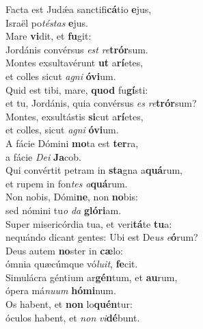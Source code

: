 \evenverse Facta est Judǽa sanctifi\textbf{cá}tio \textbf{e}jus,~\*\\
\evenverse Israël po\textit{té}\textit{stas} \textbf{e}jus.\\
\oddverse Mare \textbf{vi}dit, et \textbf{fu}git:~\*\\
\oddverse Jordánis convérsus \textit{est} \textit{re}\textbf{trór}sum.\\
\evenverse Montes exsultavérunt \textbf{ut} a\textbf{rí}etes,~\*\\
\evenverse et colles sicut \textit{a}\textit{gni} \textbf{ó}\textbf{vi}um.\\
\oddverse Quid est tibi, mare, \textbf{quod} fu\textbf{gí}sti:~\*\\
\oddverse et tu, Jordánis, quia convérsus \textit{es} \textit{re}\textbf{trór}sum?\\
\evenverse Montes, exsultástis \textbf{si}cut a\textbf{rí}etes,~\*\\
\evenverse et colles, sicut \textit{a}\textit{gni} \textbf{ó}\textbf{vi}um.\\
\oddverse A fácie Dómini \textbf{mo}ta est \textbf{ter}ra,~\*\\
\oddverse a fácie \textit{De}\textit{i} \textbf{Ja}cob.\\
\evenverse Qui convértit petram in \textbf{sta}gna a\textbf{quá}rum,~\*\\
\evenverse et rupem in fon\textit{tes} \textit{a}\textbf{quá}rum.\\
\oddverse Non nobis, Dómi\textbf{ne}, non \textbf{no}bis:~\*\\
\oddverse sed nómini tu\textit{o} \textit{da} \textbf{gló}\textbf{ri}am.\\
\evenverse Super misericórdia tua, et veri\textbf{tá}te \textbf{tu}a:~\*\\
\evenverse nequándo dicant gentes: Ubi est De\textit{us} \textit{e}\textbf{ó}rum?\\
\oddverse Deus autem \textbf{no}ster in \textbf{cæ}lo:~\*\\
\oddverse ómnia quæcúmque vó\textit{lu}\textit{it}, \textbf{fe}cit.\\
\evenverse Simulácra géntium ar\textbf{gén}tum, et \textbf{au}rum,~\*\\
\evenverse ópera má\textit{nu}\textit{um} \textbf{hó}\textbf{mi}num.\\
\oddverse Os habent, et \textbf{non} lo\textbf{quén}tur:~\*\\
\oddverse óculos habent, et \textit{non} \textit{vi}\textbf{dé}bunt.\\
